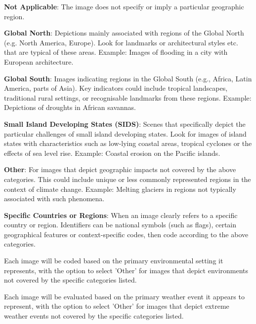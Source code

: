\begin{description}[leftmargin=2.5cm, style=multiline, labelwidth=1.5cm]
\item[0] \textbf{Not Applicable}: The image does not specify or imply a particular geographic region.

\item[1] \textbf{Global North}: Depictions mainly associated with regions of the Global North (e.g. North America, Europe). Look for landmarks or architectural styles etc. that are typical of these areas. Example: Images of flooding in a city with European architecture.

\item[2] \textbf{Global South}: Images indicating regions in the Global South (e.g., Africa, Latin America, parts of Asia). Key indicators could include tropical landscapes, traditional rural settings, or recognisable landmarks from these regions. Example: Depictions of droughts in African savannas.

\item[3] \textbf{Small Island Developing States (SIDS)}: Scenes that specifically depict the particular challenges of small island developing states. Look for images of island states with characteristics such as low-lying coastal areas, tropical cyclones or the effects of sea level rise. Example: Coastal erosion on the Pacific islands.

\item[5] \textbf{Other}: For images that depict geographic impacts not covered by the above categories. This could include unique or less commonly represented regions in the context of climate change. Example: Melting glaciers in regions not typically associated with such phenomena.

\end{description}

\textbf{Specific Countries or Regions}: When an image clearly refers to a specific country or region. Identifiers can be national symbols (such as flags), certain geographical features or context-specific codes, then code according to the above categories.

Each image will be coded based on the primary environmental setting it represents, with the option to select 'Other' for images that depict environments not covered by the specific categories listed.

\noindent
Each image will be evaluated based on the primary weather event it appears to represent, with the option to select 'Other' for images that depict extreme weather events not covered by the specific categories listed.

